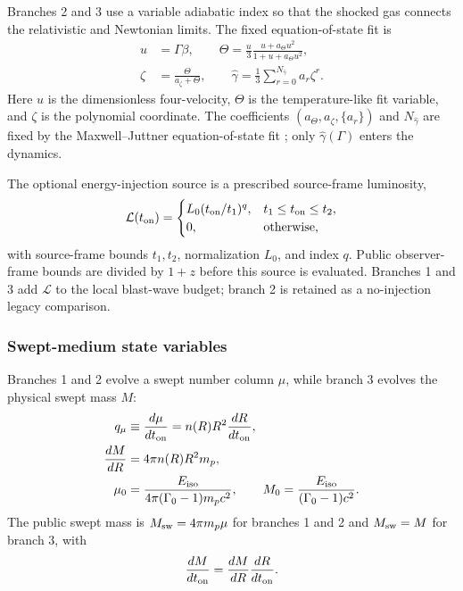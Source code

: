 \documentclass[twocolumn]{aastex702}
\begin{document}
Branches 2 and 3 use a variable adiabatic index so that the shocked gas connects
the relativistic and Newtonian limits.  The fixed equation-of-state fit is
\begin{equation}
\begin{aligned}
u&=\Gamma\beta,\qquad
\Theta=\frac{u}{3}\frac{u+a_\Theta u^2}{1+u+a_\Theta u^2},\\
\zeta&=\frac{\Theta}{a_\zeta+\Theta},\qquad
\hat{\gamma}=\frac{1}{3}\sum_{r=0}^{N_{\hat\gamma}}a_r\zeta^r .
\end{aligned}
\end{equation}
Here \(u\) is the dimensionless four-velocity, \(\Theta\) is the temperature-like
fit variable, and \(\zeta\) is the polynomial coordinate.  The coefficients
\((a_\Theta,a_\zeta,\{a_r\})\) and \(N_{\hat\gamma}\) are fixed by the
Maxwell--Juttner equation-of-state fit \citep{Service1986,Peer2012}; only
\(\hat{\gamma}(\Gamma)\) enters the dynamics.

The optional energy-injection source is a prescribed source-frame luminosity,
\begin{equation}
\mathcal{L}(t_{\rm on})=
\begin{cases}
L_0(t_{\rm on}/t_1)^{q}, & t_1\le t_{\rm on}\le t_2,\\
0, & \text{otherwise},
\end{cases}
\end{equation}
with source-frame bounds \(t_1,t_2\), normalization \(L_0\), and index \(q\).
Public observer-frame bounds are divided by \(1+z\) before this source is
evaluated.  Branches 1 and 3 add \(\mathcal{L}\) to the local blast-wave budget;
branch 2 is retained as a no-injection legacy comparison.

\subsubsection{Swept-medium state variables}

Branches 1 and 2 evolve a swept number column \(\mu\), while branch 3 evolves the
physical swept mass \(M\):
\begin{equation}
\begin{aligned}
q_\mu &\equiv\frac{d\mu}{dt_{\rm on}}
=n(R)R^2\frac{dR}{dt_{\rm on}},\\
\frac{dM}{dR} &=4\pi n(R)R^2m_p,\\
\mu_0 &=\frac{E_{\rm iso}}{4\pi(\Gamma_0-1)m_pc^2},\qquad
M_0 =\frac{E_{\rm iso}}{(\Gamma_0-1)c^2}.
\end{aligned}
\end{equation}
The public swept mass is \(M_{\rm sw}=4\pi m_p\mu\) for branches 1 and 2 and
\(M_{\rm sw}=M\) for branch 3, with
\[
\frac{dM}{dt_{\rm on}}=\frac{dM}{dR}\frac{dR}{dt_{\rm on}}.
\]
\end{document}
